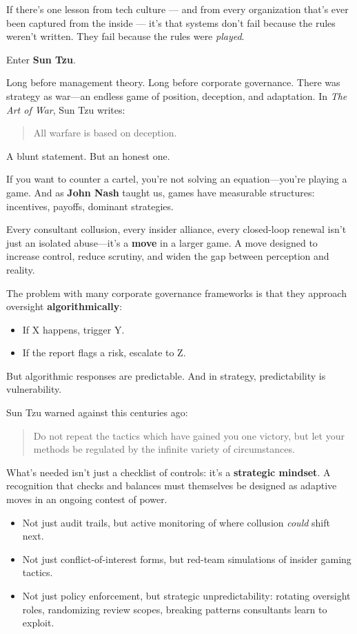 If there’s one lesson from tech culture --- and from every organization that’s ever been captured from the inside --- it’s that systems don’t fail because the rules weren’t written. They fail because the rules were \textit{played}.

Enter \textbf{Sun Tzu}.

Long before management theory. Long before corporate governance. There was strategy as war—an endless game of position, deception, and adaptation. In \textit{The Art of War}, Sun Tzu writes:

\begin{quote}
All warfare is based on deception.
\end{quote}

A blunt statement. But an honest one.

If you want to counter a cartel, you’re not solving an equation—you’re playing a game. And as \textbf{John Nash} taught us, games have measurable structures: incentives, payoffs, dominant strategies. 

Every consultant collusion, every insider alliance, every closed-loop renewal isn’t just an isolated abuse—it’s a \textbf{move} in a larger game. A move designed to increase control, reduce scrutiny, and widen the gap between perception and reality.

The problem with many corporate governance frameworks is that they approach oversight \textbf{algorithmically}:  

\begin{itemize}
  \item If X happens, trigger Y.
  \item If the report flags a risk, escalate to Z.
\end{itemize}

But algorithmic responses are predictable. And in strategy, predictability is vulnerability.

Sun Tzu warned against this centuries ago:

\begin{quote}
Do not repeat the tactics which have gained you one victory, but let your methods be regulated by the infinite variety of circumstances.
\end{quote}

What’s needed isn’t just a checklist of controls: it’s a \textbf{strategic mindset}. A recognition that checks and balances must themselves be designed as adaptive moves in an ongoing contest of power.

\begin{itemize}
  \item Not just audit trails, but active monitoring of where collusion \textit{could} shift next.
  \item Not just conflict-of-interest forms, but red-team simulations of insider gaming tactics.
  \item Not just policy enforcement, but strategic unpredictability: rotating oversight roles, randomizing review scopes, breaking patterns consultants learn to exploit.
\end{itemize}


